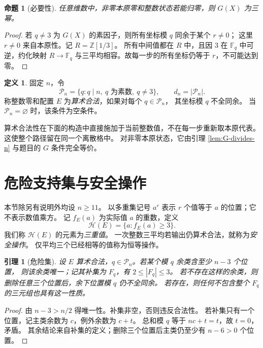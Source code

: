 \documentclass[UTF8,fontset=fandol,zihao=-4,a4paper]{ctexart}
\numberwithin{equation}{section}
\newtheorem{lemma}[theorem]{引理}
\newtheorem{proposition}[theorem]{命题}
\theoremstyle{definition}
\newtheorem{definition}[theorem]{定义}
\newcommand{\Z}{\mathbb Z}
\newcommand{\F}{\mathbb F}
\newcommand{\PP}{\mathcal P}
\newcommand{\HH}{\mathcal H}
\begin{document}
\begin{proposition}[必要性]\label{prop:necessary}
任意维数中，非零本原零和整数状态若能归零，则 $G(X)$ 为三幂。
\end{proposition}
\begin{proof}
若 $q\ne3$ 为 $G(X)$ 的素因子，则所有坐标模 $q$ 同余于某个 $r\ne0$；
这里 $r\ne0$ 来自本原性。记 $R=\Z[1/3]$。
所有中间值都在 $R$ 中，且因 $3$ 在 $\F_q$ 中可逆，约化映射
$R\to\F_q$ 与三平均相容。故每一步的所有坐标仍等于 $r$，不可能达到零。
\end{proof}

\begin{definition}\label{def:admissible}
固定 $n$，令
\[
 \PP_n=\{q:q\mid n,\ q\text{ 为素数},\ q\ne3\},\qquad d_n=|\PP_n|.
\]
称整数零和配置 $E$ 为\emph{算术合法}，如果对每个 $q\in\PP_n$，
其坐标模 $q$ 不全同余。
当 $\PP_n=\varnothing$ 时，该条件为空条件。
\end{definition}

算术合法性在下面的构造中直接施加于当前整数值，不在每一步重新取本原代表。
这使整个路径留在同一个离散格中。
对非零本原状态，它由引理 \ref{lem:G-divides-n} 与题目的 $G$ 条件完全等价。

\section{危险支持集与安全操作}\label{sec:safety}

本节除另有说明外均设 $n\ge11$。
以多重集记号 $a^r$ 表示 $r$ 个值等于 $a$ 的位置；它不表示数值乘方。
记 $f_E(a)$ 为实际值 $a$ 的重数，定义
\[
 \HH(E)=\{a:f_E(a)\ge3\}.
\]
我们称 $\HH(E)$ 的元素为\emph{三重值}。
一次整数三平均若输出仍算术合法，就称为\emph{安全操作}。
仅平均三个已经相等的值称为恒等操作。

\begin{lemma}[危险集]\label{lem:danger}
设 $E$ 算术合法，$q\in\PP_n$。若某个模 $q$ 余类含至少 $n-3$ 个位置，
则该余类唯一；记其补集为 $F_q$，有 $2\le|F_q|\le3$。
若不存在这样的余类，则删除任意三个位置后，余下位置模 $q$ 仍不全同余。
若存在，则任何不包含整个 $F_q$ 的三元组也具有这一性质。
\end{lemma}
\begin{proof}
由 $n-3>n/2$ 得唯一性。补集非空，否则违反合法性。
若补集只有一个位置，记主类余数为 $c$，例外余数为 $c+t$。
总和模 $q$ 等于 $nc+t=t$，故 $t=0$，矛盾。
其余结论来自补集的定义；删除三个位置后主类仍至少有 $n-6>0$ 个位置。
\end{proof}
\end{document}
